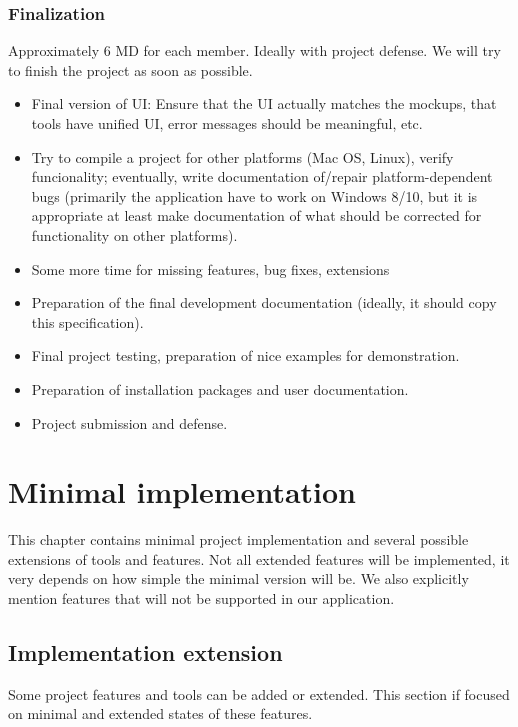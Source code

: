 \subsection{Finalization}

Approximately 6 MD for each member. Ideally with project defense. We will try to finish the project as soon as possible.

\begin{itemize}
\item Final version of UI: Ensure that the UI actually matches the mockups, that tools have unified UI, error messages should be meaningful, etc. 
\item Try to compile a project for other platforms (Mac OS, Linux), verify funcionality; eventually, write documentation of/repair platform-dependent bugs (primarily the application have to work on Windows 8/10, but it is appropriate at least make documentation of what should be corrected for functionality on other platforms).
\item Some more time for missing features, bug fixes, extensions
\item Preparation of the final development documentation (ideally, it should copy this specification).
\item Final project testing, preparation of nice examples for demonstration.
\item Preparation of installation packages and user documentation.
\item Project submission and defense.
\end{itemize}


\chapter{Minimal implementation}

This chapter contains minimal project implementation and several possible extensions of tools and features. Not all extended features will be implemented, it very depends on how simple the minimal version will be. We also explicitly mention features that will not be supported in our application.


\section{Implementation extension}

Some project features and tools can be added or extended. This section if focused on minimal and extended states of these features.


